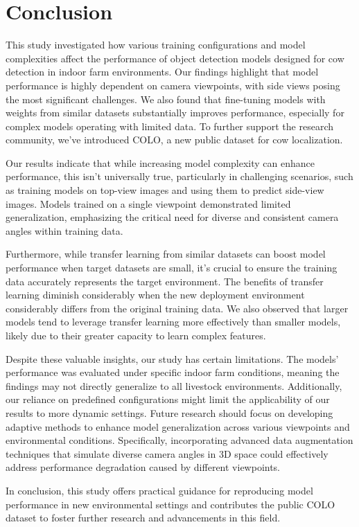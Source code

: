 \section{Conclusion}

This study investigated how various training configurations and model complexities affect the performance of object detection models designed for cow detection in indoor farm environments. Our findings highlight that model performance is highly dependent on camera viewpoints, with side views posing the most significant challenges. We also found that fine-tuning models with weights from similar datasets substantially improves performance, especially for complex models operating with limited data. To further support the research community, we've introduced COLO, a new public dataset for cow localization.

Our results indicate that while increasing model complexity can enhance performance, this isn't universally true, particularly in challenging scenarios, such as training models on top-view images and using them to predict side-view images. Models trained on a single viewpoint demonstrated limited generalization, emphasizing the critical need for diverse and consistent camera angles within training data.

Furthermore, while transfer learning from similar datasets can boost model performance when target datasets are small, it's crucial to ensure the training data accurately represents the target environment. The benefits of transfer learning diminish considerably when the new deployment environment considerably differs from the original training data. We also observed that larger models tend to leverage transfer learning more effectively than smaller models, likely due to their greater capacity to learn complex features.

Despite these valuable insights, our study has certain limitations. The models' performance was evaluated under specific indoor farm conditions, meaning the findings may not directly generalize to all livestock environments. Additionally, our reliance on predefined configurations might limit the applicability of our results to more dynamic settings. Future research should focus on developing adaptive methods to enhance model generalization across various viewpoints and environmental conditions. Specifically, incorporating advanced data augmentation techniques that simulate diverse camera angles in 3D space could effectively address performance degradation caused by different viewpoints.

In conclusion, this study offers practical guidance for reproducing model performance in new environmental settings and contributes the public COLO dataset to foster further research and advancements in this field.